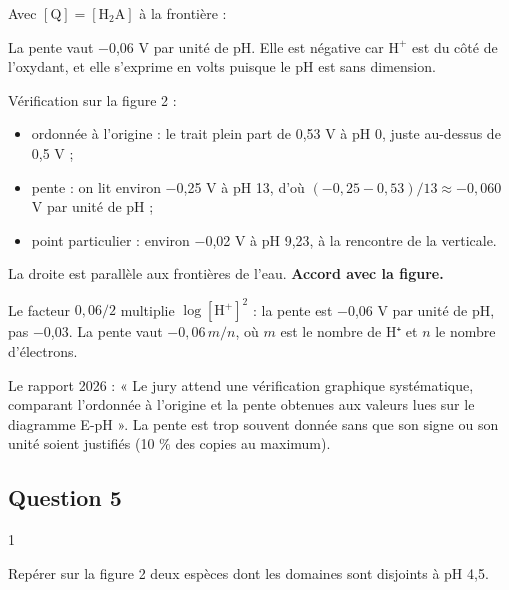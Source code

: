 \documentclass[11pt,a4paper]{article}
\providecommand{\tightlist}{\setlength{\itemsep}{0pt}\setlength{\parskip}{0pt}}
\newcommand{\equationajustee}[1]{%
  \sbox{\boiteequation}{$\displaystyle #1$}%
  \ifdim\wd\boiteequation>\linewidth
    \[\resizebox{\linewidth}{!}{\usebox{\boiteequation}}\]%
  \else
    \[#1\]%
  \fi}
\begin{document}
Avec \([\mathrm Q] = [\mathrm{H_2A}]\) à la frontière :

\equationajustee{\boxed{E_{A/C} = 0{,}53 - 0{,}06\,\mathrm{pH}\ \ (\mathrm V)}}

La pente vaut −0,06 V par unité de pH. Elle est négative car \(\mathrm H^+\) est du côté de l'oxydant, et elle s'exprime en volts puisque le pH est sans dimension.

Vérification sur la figure 2 :

\begin{itemize}
\tightlist
\item
  ordonnée à l'origine : le trait plein part de 0,53 V à pH 0, juste au-dessus de 0,5 V ;
\item
  pente : on lit environ −0,25 V à pH 13, d'où \((-0{,}25 - 0{,}53)/13 \approx -0{,}060\) V par unité de pH ;
\item
  point particulier : environ −0,02 V à pH 9,23, à la rencontre de la verticale.
\end{itemize}

La droite est parallèle aux frontières de l'eau. \textbf{Accord avec la figure.}

\begin{piege}

Le facteur \(0{,}06/2\) multiplie \(\log[\mathrm H^+]^2\) : la pente est −0,06 V par unité de pH, pas −0,03. La pente vaut \(-0{,}06\,m/n\), où \(m\) est le nombre de H⁺ et \(n\) le nombre d'électrons.

\end{piege}

\begin{jury}

Le rapport 2026 : « Le jury attend une vérification graphique systématique, comparant l'ordonnée à l'origine et la pente obtenues aux valeurs lues sur le diagramme E-pH ». La pente est trop souvent donnée sans que son signe ou son unité soient justifiés (10 \% des copies au maximum).

\end{jury}

\hypertarget{question-5}{%
\subsection{Question 5}\label{question-5}}

\begin{indication}{1}

Repérer sur la figure 2 deux espèces dont les domaines sont disjoints à pH 4,5.

\end{indication}
\end{document}
